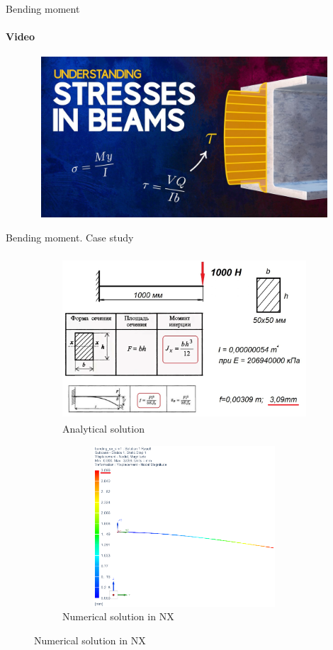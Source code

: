 \documentclass[aspectratio=169]{beamer}
\begin{document}
\begin{frame}[t]{Bending moment}
    \framesubtitle{Video}
    \vspace{-0.6cm}
    \begin{figure}[H]
        \href{https://youtu.be/f08Y39UiC-o}{
            \centering\includegraphics[height=6cm,width=1\textwidth,keepaspectratio]{bending_stress_video.jpg}}
        \label{fig:bending_stress_video.jpg}
    \end{figure}
\end{frame}

\begin{frame}[t]{Bending moment. Case study}
\framesubtitle{}
    \vspace{-0.6cm}
    \begin{figure}[H]
        \begin{subfigure}{0.49\textwidth}
            \centering\includegraphics[height=6cm,width=1\textwidth,keepaspectratio]{task.png}
            \caption*{Analytical solution}
            \label{fig:task.png}
        \end{subfigure}
        \begin{subfigure}{0.49\textwidth}
            \centering\includegraphics[height=6cm,width=1\textwidth,keepaspectratio]{bending_ex_sim1.png}
            \caption*{Numerical solution in NX}
            \label{fig:bending_ex_sim1.png}
        \end{subfigure}
    \end{figure}
\end{frame}
\end{document}
